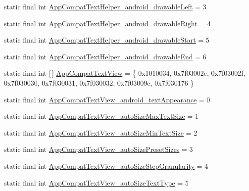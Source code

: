 \begin{DoxyCompactItemize}
\item 
static final int \mbox{\hyperlink{classcom_1_1synnapps_1_1carouselview_1_1_r_1_1styleable_a33999ba03eb966db667e027bf377870e}{App\+Compat\+Text\+Helper\+\_\+android\+\_\+drawable\+Left}} = 3
\item 
static final int \mbox{\hyperlink{classcom_1_1synnapps_1_1carouselview_1_1_r_1_1styleable_aac609c7bc07c1bd65ae4eba2f137f0d0}{App\+Compat\+Text\+Helper\+\_\+android\+\_\+drawable\+Right}} = 4
\item 
static final int \mbox{\hyperlink{classcom_1_1synnapps_1_1carouselview_1_1_r_1_1styleable_ac624d78961841923084613f0115eb73f}{App\+Compat\+Text\+Helper\+\_\+android\+\_\+drawable\+Start}} = 5
\item 
static final int \mbox{\hyperlink{classcom_1_1synnapps_1_1carouselview_1_1_r_1_1styleable_affd550f257ce1de75a73f24106c2a73e}{App\+Compat\+Text\+Helper\+\_\+android\+\_\+drawable\+End}} = 6
\item 
static final int \mbox{[}$\,$\mbox{]} \mbox{\hyperlink{classcom_1_1synnapps_1_1carouselview_1_1_r_1_1styleable_adddd9f4e0c4a65656c99a2f22a423d71}{App\+Compat\+Text\+View}} = \{ 0x1010034, 0x7f03002e, 0x7f03002f, 0x7f030030, 0x7f030031, 0x7f030032, 0x7f03009e, 0x7f030176 \}
\item 
static final int \mbox{\hyperlink{classcom_1_1synnapps_1_1carouselview_1_1_r_1_1styleable_ad722d30341d78d2f6131edd334c9322e}{App\+Compat\+Text\+View\+\_\+android\+\_\+text\+Appearance}} = 0
\item 
static final int \mbox{\hyperlink{classcom_1_1synnapps_1_1carouselview_1_1_r_1_1styleable_a909d8d27b330fdf6f8180695809c8df2}{App\+Compat\+Text\+View\+\_\+auto\+Size\+Max\+Text\+Size}} = 1
\item 
static final int \mbox{\hyperlink{classcom_1_1synnapps_1_1carouselview_1_1_r_1_1styleable_a7b43ac25ab19d3d4a0c4d2c7147b77a0}{App\+Compat\+Text\+View\+\_\+auto\+Size\+Min\+Text\+Size}} = 2
\item 
static final int \mbox{\hyperlink{classcom_1_1synnapps_1_1carouselview_1_1_r_1_1styleable_aa45e048c29f8007219bb6e481e943a07}{App\+Compat\+Text\+View\+\_\+auto\+Size\+Preset\+Sizes}} = 3
\item 
static final int \mbox{\hyperlink{classcom_1_1synnapps_1_1carouselview_1_1_r_1_1styleable_a176b4e63371886ab3d86bebbcae31190}{App\+Compat\+Text\+View\+\_\+auto\+Size\+Step\+Granularity}} = 4
\item 
static final int \mbox{\hyperlink{classcom_1_1synnapps_1_1carouselview_1_1_r_1_1styleable_a1614e94376cec9cc162ca9cd9459d973}{App\+Compat\+Text\+View\+\_\+auto\+Size\+Text\+Type}} = 5

\end{DoxyCompactItemize}
